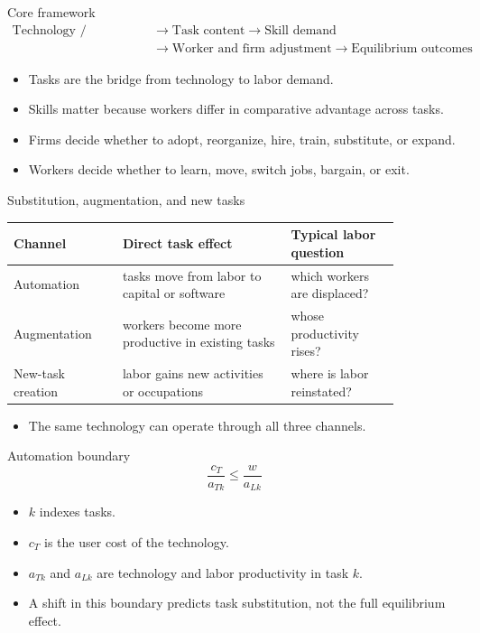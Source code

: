 \documentclass[aspectratio=169,11pt]{beamer}
\begin{document}
\begin{frame}{Core framework}
\small
\[
\begin{aligned}
\text{Technology / Innovation}
&\rightarrow
\text{Task content}
\rightarrow
\text{Skill demand} \\
&\rightarrow
\text{Worker and firm adjustment}
\rightarrow
\text{Equilibrium outcomes}
\end{aligned}
\]
\begin{itemize}
    \item Tasks are the bridge from technology to labor demand.
    \item Skills matter because workers differ in comparative advantage across tasks.
    \item Firms decide whether to adopt, reorganize, hire, train, substitute, or expand.
    \item Workers decide whether to learn, move, switch jobs, bargain, or exit.
\end{itemize}
\end{frame}

\begin{frame}{Substitution, augmentation, and new tasks}
\small
\begin{tabular}{p{0.24\linewidth} p{0.37\linewidth} p{0.24\linewidth}}
\toprule
Channel & Direct task effect & Typical labor question \\
\midrule
Automation & tasks move from labor to capital or software & which workers are displaced? \\
Augmentation & workers become more productive in existing tasks & whose productivity rises? \\
New-task creation & labor gains new activities or occupations & where is labor reinstated? \\
\bottomrule
\end{tabular}
\vspace{0.35cm}
\begin{itemize}
    \item The same technology can operate through all three channels.
\end{itemize}
\end{frame}

\begin{frame}{Automation boundary}
\[
\frac{c_T}{a_{Tk}} \leq \frac{w}{a_{Lk}}
\]
\begin{itemize}
    \item $k$ indexes tasks.
    \item $c_T$ is the user cost of the technology.
    \item $a_{Tk}$ and $a_{Lk}$ are technology and labor productivity in task $k$.
    \item A shift in this boundary predicts task substitution, not the full equilibrium effect.
\end{itemize}
\end{frame}
\end{document}
